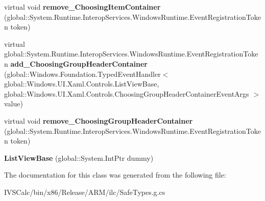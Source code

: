 \begin{DoxyCompactItemize}
virtual void {\bfseries remove\+\_\+\+Choosing\+Item\+Container} (global\+::\+System.\+Runtime.\+Interop\+Services.\+Windows\+Runtime.\+Event\+Registration\+Token token)
\item 
\mbox{\label{class_windows_1_1_u_i_1_1_xaml_1_1_controls_1_1_list_view_base_ab0f949b356d976e285641bfd3da7aaa5}} 
virtual global\+::\+System.\+Runtime.\+Interop\+Services.\+Windows\+Runtime.\+Event\+Registration\+Token {\bfseries add\+\_\+\+Choosing\+Group\+Header\+Container} (global\+::\+Windows.\+Foundation.\+Typed\+Event\+Handler$<$ global\+::\+Windows.\+U\+I.\+Xaml.\+Controls.\+List\+View\+Base, global\+::\+Windows.\+U\+I.\+Xaml.\+Controls.\+Choosing\+Group\+Header\+Container\+Event\+Args $>$ value)
\item 
\mbox{\label{class_windows_1_1_u_i_1_1_xaml_1_1_controls_1_1_list_view_base_a514f2814e24dfe36251dae6870528441}} 
virtual void {\bfseries remove\+\_\+\+Choosing\+Group\+Header\+Container} (global\+::\+System.\+Runtime.\+Interop\+Services.\+Windows\+Runtime.\+Event\+Registration\+Token token)
\item 
\mbox{\label{class_windows_1_1_u_i_1_1_xaml_1_1_controls_1_1_list_view_base_a03e11b8607c3d8428a5603387ff9370f}} 
{\bfseries List\+View\+Base} (global\+::\+System.\+Int\+Ptr dummy)
\end{DoxyCompactItemize}


The documentation for this class was generated from the following file\+:\begin{DoxyCompactItemize}
\item 
I\+V\+S\+Calc/bin/x86/\+Release/\+A\+R\+M/ilc/Safe\+Types.\+g.\+cs\end{DoxyCompactItemize}
